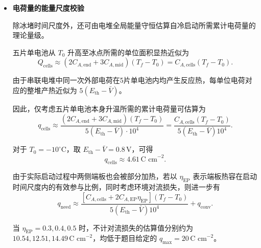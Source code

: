 \documentclass[bwprint]{gmcmthesis}
\numberwithin{figure}{section}
\begin{document}
\begin{itemize}
\noindent 进一步地，若由单片电压约束
\[
V_k(j,t) \geq 0.30 \, \text{V}
\]
反求某时刻第 \(k\) 片电池能够承受的最大安全电流 \(j_{V,k}(t)\)，则不限制具体策略形式时，可定义理论安全电流包络
\begin{equation}
j^*(t) = \min \left\{ j_{\text{max}}, \min_k j_{V,k}(t) \right\}. \tag{5-61}
\end{equation}

\noindent （5-61）给出了参数化策略可参考的理论上界：任何实际加载策略既不能超过最大电流密度，也不能超过由最薄弱单电池电压安全条件决定的瞬时允许电流。但这包络是否呈明显的“先低后高”结构仍取决于当前模型计算得到的温度、冰量及电压轨迹，不能预先作为数值结果。

\item \textbf {电荷量的能量尺度校验}

\noindent 除冰堵时间尺度外，还可由电堆全局能量守恒估算自冷启动所需累计电荷量的理论量级。

\noindent 五片单电池从 \(T_0\) 升高至冰点所需的单位面积显热近似为
\begin{equation}
Q_{\text{cells}} \approx (2C_{A,\text{end}} + 3C_{A,\text{mid}})(T_f - T_0) = C_{A,\text{cells}}(T_f - T_0). \tag{5-62}
\end{equation}

\noindent 由于串联电堆中同一次外部电荷在5片单电池内均产生反应热，每单位电荷对应的整堆产热近似为 \(5(E_{\text{th}} - \bar{V})\)。

\noindent 因此，仅考虑五片单电池本身升温所需的累计电荷量可估算为
\begin{equation}
q_{\text{cells}} \approx \frac{(2C_{A,\text{end}} + 3C_{A,\text{mid}})(T_f - T_0)}{5(E_{\text{th}} - \bar{V}) \cdot 10^4} = \frac{C_{A,\text{cells}}(T_f - T_0)}{5(E_{\text{th}} - \bar{V}) 10^4}. \tag{5-63}
\end{equation}

\noindent 对于 \(T_0 = -10^\circ\text{C}\)，取 \(E_{\text{th}} - \bar{V} = 0.8 \, \text{V}\)，可得
\[
q_{\text{cells}} \approx 4.61 \, \text{C cm}^{-2}.
\]

\noindent 由于实际启动过程中两侧端板也会被部分加热，若以 \(\eta_{\text{EP}}\) 表示端板热容在启动时间尺度内的有效参与比例，同时考虑环境对流损失，则进一步有
\begin{equation}
q_{\text{need}} \approx \frac{[C_{A,\text{cells}} + 2C_{A,\text{EP}}\eta_{\text{EP}}](T_f - T_0)}{5(E_{\text{th}} - \bar{V}) 10^4} + q_{\text{conv}}. \tag{5-64}
\end{equation}

\noindent 当 \(\eta_{\text{EP}} = 0.3,0.4,0.5\) 时，不计对流损失的估算值分别约为 \(10.54,12.51,14.49 \, \text{C cm}^{-2}\)，均低于题目给定的 \(q_{\text{max}} = 20 \, \text{C cm}^{-2}\)。


\end{itemize}
\end{document}
